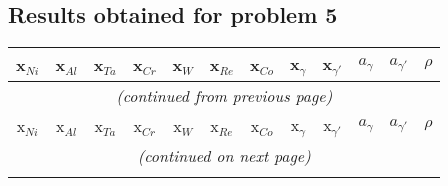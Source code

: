 \subsection{Results obtained for problem 5}

\begin{longtable}{rrrrrrrrrrrr}
    \multicolumn{1}{c}{x$_{Ni}$} & \multicolumn{1}{c}{x$_{Al}$} & \multicolumn{1}{c}{x$_{Ta}$} & \multicolumn{1}{c}{x$_{Cr}$} & \multicolumn{1}{c}{x$_{W}$} & \multicolumn{1}{c}{x$_{Re}$} & \multicolumn{1}{c}{x$_{Co}$} & \multicolumn{1}{c}{x$_{\gamma}$} & \multicolumn{1}{c}{x$_{\gamma'}$} & \multicolumn{1}{c}{$a_\gamma$} & \multicolumn{1}{c}{$a_{\gamma'}$} & \multicolumn{1}{c}{$\rho$} \\ \hline \hline
    \endfirsthead
    
    \multicolumn{12}{c}{\textit{(continued from previous page)}} \\
    \multicolumn{1}{c}{x$_{Ni}$} & \multicolumn{1}{c}{x$_{Al}$} & \multicolumn{1}{c}{x$_{Ta}$} & \multicolumn{1}{c}{x$_{Cr}$} & \multicolumn{1}{c}{x$_{W}$} & \multicolumn{1}{c}{x$_{Re}$} & \multicolumn{1}{c}{x$_{Co}$} & \multicolumn{1}{c}{x$_{\gamma}$} & \multicolumn{1}{c}{x$_{\gamma'}$} & \multicolumn{1}{c}{$a_\gamma$} & \multicolumn{1}{c}{$a_{\gamma'}$} & \multicolumn{1}{c}{$\rho$} \\ \hline \hline
    \endhead
    
    \multicolumn{12}{c}{\textit{(continued on next page)}} \\
    \endfoot
    
    \endlastfoot
    

\end{longtable}
